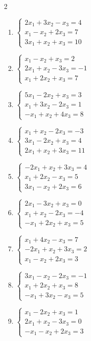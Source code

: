\begin{multicols}{2}
\begin{enumerate}[label=\arabic*., leftmargin=*]
\item $\begin{cases}2x_1+3x_2-x_3=4\\x_1-x_2+2x_3=7\\3x_1+x_2+x_3=10\end{cases}$

\item $\begin{cases}x_1-x_2+x_3=2\\2x_1+x_2-3x_3=-1\\x_1+2x_2+x_3=7\end{cases}$

\item $\begin{cases}5x_1-2x_2+x_3=3\\x_1+3x_2-2x_3=1\\-x_1+x_2+4x_3=8\end{cases}$

\item $\begin{cases}x_1+x_2-2x_3=-3\\3x_1-2x_2+x_3=4\\2x_1+x_2+3x_3=11\end{cases}$

\item $\begin{cases}-2x_1+x_2+3x_3=4\\x_1+2x_2-x_3=5\\3x_1-x_2+2x_3=6\end{cases}$

\item $\begin{cases}2x_1-3x_2+x_3=0\\x_1+x_2-2x_3=-4\\-x_1+2x_2+x_3=5\end{cases}$

\item $\begin{cases}x_1+4x_2-x_3=7\\-2x_1+x_2+3x_3=2\\x_1-x_2+2x_3=3\end{cases}$

\item $\begin{cases}3x_1-x_2-2x_3=-1\\x_1+2x_2+x_3=8\\-x_1+3x_2-x_3=5\end{cases}$

\item $\begin{cases}x_1-2x_2+x_3=1\\2x_1+x_2-3x_3=0\\-x_1-x_2+2x_3=3\end{cases}$


\end{enumerate}
\end{multicols}
